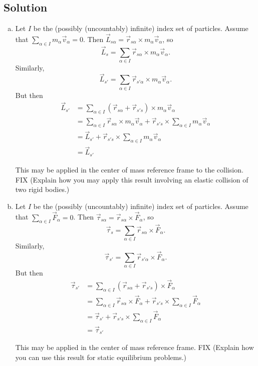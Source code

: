 \documentclass[solutions]{esg8012pset}
\begin{document}
\subsection{Solution}
  \begin{enumerate}[(a)]
    \item Let $I$ be the (possibly (uncountably) infinite) index set of particles.  Assume that $\displaystyle \sum_{\alpha\in I} m_\alpha \vec v_\alpha = 0$.  Then $\vec L_{s\alpha} = \vec r_{s\alpha} \times m_\alpha \vec v_\alpha$, so $$\displaystyle \vec L_{s} = \sum_{\alpha\in I}\vec r_{s\alpha} \times m_\alpha \vec v_\alpha.$$  Similarly, $$\displaystyle \vec L_{s'} = \sum_{\alpha\in I}\vec r_{s'\alpha} \times m_\alpha \vec v_\alpha.$$  But then \begin{align*}
    \vec L_{s'} & = \sum_{\alpha\in I}(\vec r_{s\alpha} + \vec r_{s's}) \times m_\alpha \vec v_\alpha \\
    & = \sum_{\alpha\in I}\vec r_{s\alpha} \times m_\alpha \vec v_\alpha + \vec r_{s's} \times \sum_{\alpha\in I} m_\alpha \vec v_\alpha \\
    & = \vec L_{s'} + \vec r_{s's} \times \sum_{\alpha\in I} m_\alpha \vec v_\alpha \\
    & = \vec L_{s'}
    \end{align*} \par
    This may be applied in the center of mass reference frame to the collision.  FIX (Explain how you may apply this result involving an elastic collision of two rigid bodies.)
    \item Let $I$ be the (possibly (uncountably) infinite) index set of particles.  Assume that $\displaystyle \sum_{\alpha\in I} \vec F_\alpha = 0$.  Then $\vec \tau_{s\alpha} = \vec r_{s\alpha} \times \vec F_\alpha$, so $$\displaystyle \vec \tau_{s} = \sum_{\alpha\in I}\vec r_{s\alpha} \times \vec F_\alpha.$$  Similarly, $$\displaystyle \vec \tau_{s'} = \sum_{\alpha\in I}\vec r_{s'\alpha} \times \vec F_\alpha.$$  But then \begin{align*}
    \vec \tau_{s'} & = \sum_{\alpha\in I}(\vec r_{s\alpha} + \vec r_{s's}) \times \vec F_\alpha \\
    & = \sum_{\alpha\in I}\vec r_{s\alpha} \times \vec F_\alpha + \vec r_{s's} \times \sum_{\alpha\in I} \vec F_\alpha \\
    & = \vec \tau_{s'} + \vec r_{s's} \times \sum_{\alpha\in I} \vec F_\alpha \\
    & = \vec \tau_{s'}
    \end{align*} \par
    This may be applied in the center of mass reference frame. FIX (Explain how you can use this result for static equilibrium problems.)
  \end{enumerate}
\end{document}
